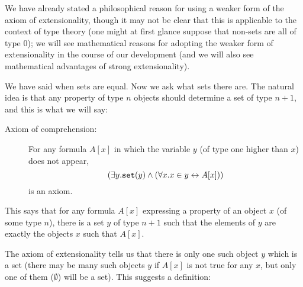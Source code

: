 \documentclass[12pt]{book}
\begin{document}
We have already stated a philosophical reason for using a weaker form
of the axiom of extensionality, though it may not be clear that this
is applicable to the context of type theory (one might at first glance
suppose that non-sets are all of type 0); we will see mathematical
reasons for adopting the weaker form of extensionality in the course
of our development (and we will also see mathematical advantages of
strong extensionality).

We have said when sets are equal.  Now we ask what sets there are.
The natural idea is that any property of type $n$ objects should
determine a set of type $n+1$, and this is what we will say:

\begin{description}
\item[Axiom of comprehension:] 

For any formula $A[x]$ in which the
variable $y$ (of type one higher than $x$) does not appear, $$(\exists
y.{\tt set}(y) \wedge (\forall x.x \in y \leftrightarrow A[x]))$$ is an axiom.

\end{description}

This says that for any formula $A[x]$ expressing a property of an
object $x$ (of some type $n$), there is a set $y$ of type $n+1$ such
that the elements of $y$ are exactly the objects $x$ such that $A[x]$.

The axiom of extensionality tells us that there is only one such
object $y$ which is a set (there may be many such objects $y$ if
$A[x]$ is not true for any $x$, but only one of them ($\emptyset$)
will be a set). This suggests a definition:
\end{document}
